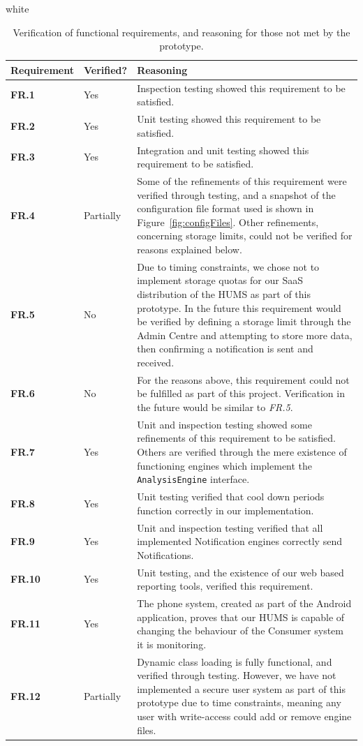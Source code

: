 \documentclass[10pt,a4paper]{article}
\newcommand{\tableformat}[4]{
\begin{table}[ht!]
\centering
  \rowcolors{2}{gray!10} {white}
\def\arraystretch{1.5}
\begin{tabularx}{\textwidth}{#1}
  \hline
  \rowcolor[gray]{0.9} #2
  \hline
\end{tabularx}
\caption{#3}
\label{#4}
\end{table}}
\newcommand{\fr}[1]{\textcolor{reqColor}{\textbf{FR.#1}}}
\begin{document}
\tableformat{ p{2cm}  p{2cm} X }{
Requirement & Verified? & Reasoning \\ \hline
\fr{1} & Yes & Inspection testing showed this requirement to be satisfied.\\
\fr{2} & Yes & Unit testing showed this requirement to be satisfied.\\
\fr{3} & Yes & Integration and unit testing showed this requirement to be satisfied.\\
\fr{4} & Partially & Some of the refinements of this requirement were verified through testing, and a snapshot of the configuration file format used is shown in Figure~\ref{fig:configFiles}. Other refinements, concerning storage limits, could not be verified for reasons explained below. \\
\fr{5} & No & Due to timing constraints, we chose not to implement storage quotas for our SaaS distribution of the HUMS as part of this prototype. In the future this requirement would be verified by defining a storage limit through the Admin Centre and attempting to store more data, then confirming a notification is sent and received.\\
\fr{6} & No & For the reasons above, this requirement could not be fulfilled as part of this project. Verification in the future would be similar to \emph{FR.5}.\\
\fr{7} & Yes & Unit and inspection testing showed some refinements of this requirement to be satisfied. Others are verified through the mere existence of functioning engines which implement the \texttt{AnalysisEngine} interface.\\
\fr{8} & Yes & Unit testing verified that cool down periods function correctly in our implementation. \\
\fr{9} & Yes & Unit and inspection testing verified that all implemented Notification engines correctly send Notifications.\\
\fr{10}& Yes & Unit testing, and the existence of our web based reporting tools, verified this requirement.\\
\fr{11}& Yes & The phone system, created as part of the Android application, proves that our HUMS is capable of changing the behaviour of the Consumer system it is monitoring.\\
\fr{12}& Partially & Dynamic class loading is fully functional, and verified through testing. However, we have not implemented a secure user system as part of this prototype due to time constraints, meaning any user with write-access could add or remove engine files. \\
}{Verification of functional requirements, and reasoning for those not met by the prototype.}{tab:functionalEval}
\end{document}
